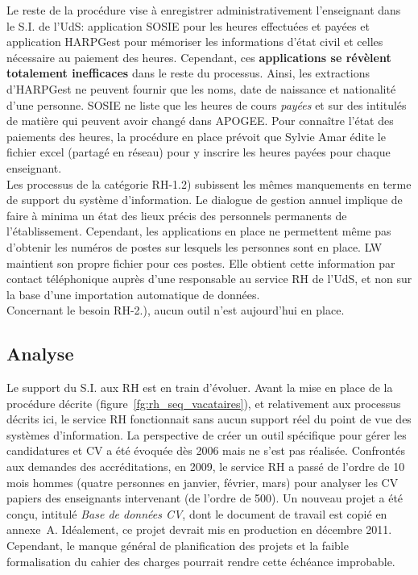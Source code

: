 \documentclass{book}
\begin{document}
Le reste de la procédure vise à enregistrer administrativement l'enseignant
dans le S.I. de l'UdS: application SOSIE pour les heures effectuées et payées
et application HARPGest pour mémoriser les informations d'état civil et celles
nécessaire au paiement des heures. 
Cependant, ces \textbf{applications se révèlent totalement inefficaces} dans 
le reste du processus. Ainsi, les extractions d'HARPGest ne peuvent fournir
que les noms, date de naissance et nationalité d'une personne. SOSIE ne liste
que les heures de cours \emph{payées} et sur des intitulés de matière qui
peuvent avoir changé dans APOGEE.
Pour connaître l'état des paiements des heures, la procédure en place prévoit
que Sylvie Amar édite le fichier excel (partagé en réseau) pour y inscrire 
les heures payées pour chaque enseignant.\\

Les processus de la catégorie RH-1.2) subissent les mêmes manquements en terme
de support du système d'information. Le dialogue de gestion annuel implique
de faire à minima un état des lieux précis des personnels permanents de 
l'établissement. Cependant, les applications en place ne permettent même pas
d'obtenir les numéros de postes sur lesquels les personnes sont en place.
LW maintient son propre fichier pour ces postes. Elle obtient cette information
par contact téléphonique auprès d'une responsable au service RH de l'UdS, et
non sur la base d'une importation automatique de données.\\

Concernant le besoin RH-2.), aucun outil n'est aujourd'hui en place.

\subsection{Analyse}

Le support du S.I. aux RH est en train d'évoluer. Avant la mise en place
de la procédure décrite (figure~\ref{fg:rh_seq_vacataires}), et relativement 
aux processus décrits ici, le service RH fonctionnait sans aucun support réel 
du point de vue des systèmes d'information. La perspective de créer un outil 
spécifique pour gérer les candidatures et CV a été évoquée dès 2006 mais ne 
s'est pas réalisée. 
Confrontés aux demandes des accréditations, en 2009, le service RH a passé
de l'ordre de 10 mois hommes (quatre personnes en janvier, février, mars)
pour analyser les CV papiers des enseignants intervenant (de l'ordre de 500). 
Un nouveau projet a été conçu, intitulé \textit{Base de 
données CV}, dont le document de travail est copié en annexe~A.%
Idéalement, ce projet devrait mis en production en décembre 2011. 
Cependant, le manque général de planification des projets et la faible 
formalisation du cahier des charges pourrait rendre cette échéance improbable.\\
\end{document}
